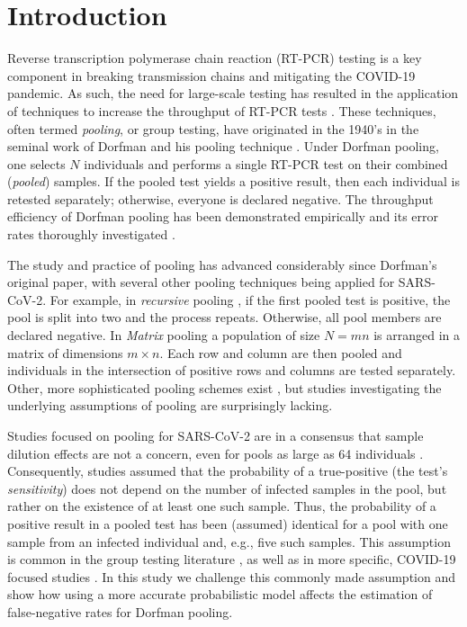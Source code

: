 \documentclass{article}
\begin{document}
\section*{Introduction}
Reverse transcription polymerase chain reaction (RT-PCR) testing is a
key component in breaking transmission chains and mitigating the
COVID-19 pandemic. As such, the need for large-scale testing has
resulted in the application of techniques to increase the throughput
of RT-PCR tests \cite{DorfmanYuvalDor, PoolSize30, BayesianDorfman,
  MatrixPooling, LionDorfman, CherifReview}. These techniques, often
termed \emph{pooling}, or group testing, have originated in the 1940's
in the seminal work of Dorfman and his pooling technique
\cite{DorfmanOriginal, DorfmanYuvalDor}. Under Dorfman pooling, one
selects $N$ individuals and performs a single RT-PCR test on their
combined (\emph{pooled}) samples. If the pooled test yields a positive
result, then each individual is retested separately; otherwise,
everyone is declared negative. The throughput efficiency of Dorfman
pooling has been demonstrated empirically \cite{DorfmanYuvalDor} and
its error rates thoroughly investigated \cite{Kim, Simplistic1,
  OptimalDorfmanPool}. 
  
The study and practice of pooling has advanced considerably since Dorfman's original paper, with 
several other pooling techniques being applied for SARS-CoV-2.
For example, in \emph{recursive} pooling \cite{Kim,RecursiveSevenFold}, if the
first pooled test is positive, the pool is split into two and the
process repeats. Otherwise, all pool members are declared negative.
In \emph{Matrix} pooling \cite{MatrixPooling} a population of size
$N=mn$ is arranged in a matrix of dimensions $m\times n$. Each
row and column are then pooled and individuals in the intersection of
positive rows and columns are tested separately. Other, more sophisticated
pooling schemes exist \cite{CompressedPooling}, but studies investigating the 
underlying assumptions of pooling are surprisingly lacking.

Studies focused on pooling for SARS-CoV-2 are in a consensus that
sample dilution effects \cite{DilutionHIV, GroupDilution} are not a
concern, even for pools as large as 64 individuals \cite{PoolSize30,
  Lion, DorfmanYuvalDor, DilutionCOVID, CherifReview}. Consequently,
studies assumed that the probability of a true-positive (the test's
\emph{sensitivity}) does not depend on the number of infected samples
in the pool, but rather on the existence of at least one such
sample. Thus, the probability of a positive result in a pooled test
has been (assumed) identical for a pool with one sample from an
infected individual and, e.g., five such samples. This assumption is
common in the group testing literature \cite{Kim, OptimalDorfmanPool,
  CherifReview}, as well as in more specific, COVID-19 focused studies
\cite{Simplistic1, Simplistic2}. In this study we challenge this
commonly made assumption and show how using a more accurate
probabilistic model affects the estimation of false-negative rates for
Dorfman pooling.
\end{document}
